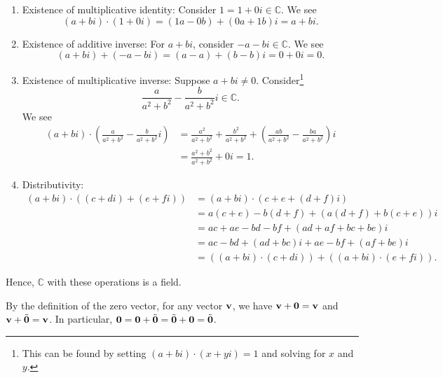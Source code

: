 \begin{sltn}[\ref{exer:cfield}]
\begin{enumerate}
    \item Existence of multiplicative identity: Consider $ 1=1+0i\in\mathbb{C} $. We see
    \begin{equation*}
        (a+bi)\cdot(1+0i)=(1a-0b)+(0a+1b)i=a+bi.
    \end{equation*}

    \item Existence of additive inverse: For $ a+bi $, consider $ -a-bi\in\mathbb{C} $. We see
    \begin{equation*}
        (a+bi)+(-a-bi)=(a-a)+(b-b)i=0+0i=0.
    \end{equation*}

    \item Existence of multiplicative inverse: Suppose $ a+bi\neq 0 $. Consider\footnote{This can be found by setting $ (a+bi)\cdot(x+y i)=1 $ and solving for $ x $ and $ y $.}
    \begin{equation*}
        \frac{a}{a^2+b^2}-\frac{b}{a^2+b^2}i\in\mathbb{C}.
    \end{equation*}
    We see
    \begin{align*}
        (a+bi)\cdot\left(\frac{a}{a^2+b^2}-\frac{b}{a^2+b^2}i\right) &= \frac{a^2}{a^2+b^2}+\frac{b^2}{a^2+b^2}+\left(\frac{ab}{a^2+b^2}-\frac{ba}{a^2+b^2}\right)i \\
        &= \frac{a^2+b^2}{a^2+b^2}+0i=1.
    \end{align*}

    \item Distributivity:
    \begin{align*}
        (a+bi)\cdot((c+di)+(e+fi)) &= (a+bi)\cdot(c+e+(d+f)i) \\
        &= a(c+e)-b(d+f)+(a(d+f)+b(c+e))i \\
        &= ac+ae-bd-bf+(ad+af+bc+be)i \\
        &= ac-bd+(ad+bc)i+ae-bf+(af+be)i \\
        &= ((a+bi)\cdot(c+di))+((a+bi)\cdot(e+fi)).
    \end{align*}
\end{enumerate}
Hence, $ \mathbb{C} $ with these operations is a field.
\end{sltn}

\begin{sltn}[\ref{exer:0unique}]
By the definition of the zero vector, for any vector $ \mathbf{v} $, we have $ \mathbf{v}+\mathbf{0}=\mathbf{v} $ and $ \mathbf{v}+\tilde{\mathbf{0}}=\mathbf{v} $. In particular, $ \mathbf{0}=\mathbf{0}+\tilde{\mathbf{0}}=\tilde{\mathbf{0}}+\mathbf{0}=\tilde{\mathbf{0}} $.
\end{sltn}

